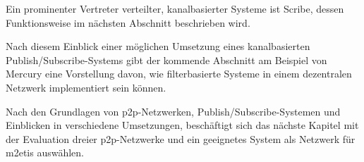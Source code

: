 Ein prominenter Vertreter verteilter, kanalbasierter Systeme ist Scribe, dessen Funktionsweise im nächsten Abschnitt beschrieben wird.



Nach diesem Einblick einer möglichen Umsetzung eines kanalbasierten Publish/Subscribe-Systems gibt der kommende Abschnitt am Beispiel von Mercury eine Vorstellung davon, wie filterbasierte Systeme in einem dezentralen Netzwerk implementiert sein können.





Nach den Grundlagen von \ac{p2p}-Netzwerken, Publish/Subscribe-Systemen und Einblicken in verschiedene Umsetzungen, beschäftigt sich das nächste Kapitel mit der Evaluation dreier \ac{p2p}-Netzwerke und ein geeignetes System als Netzwerk für \ac{m2etis} auswählen.

